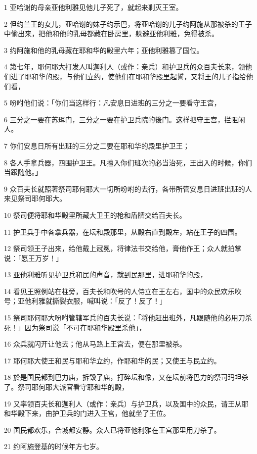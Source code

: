 \par 1 亚哈谢的母亲亚他利雅见他儿子死了，就起来剿灭王室。
\par 2 但约兰王的女儿，亚哈谢的妹子约示巴，将亚哈谢的儿子约阿施从那被杀的王子中偷出来，把他和他的乳母都藏在卧房里，躲避亚他利雅，免得被杀。
\par 3 约阿施和他的乳母藏在耶和华的殿里六年；亚他利雅篡了国位。
\par 4 第七年，耶何耶大打发人叫迦利人（或作：亲兵）和护卫兵的众百夫长来，领他们进了耶和华的殿，与他们立约，使他们在耶和华殿里起誓，又将王的儿子指给他们看，
\par 5 吩咐他们说：「你们当这样行：凡安息日进班的三分之一要看守王宫，
\par 6 三分之一要在苏珥门，三分之一要在护卫兵院的後门。这样把守王宫，拦阻闲人。
\par 7 你们安息日所有出班的三分之二要在耶和华的殿里护卫王；
\par 8 各人手拿兵器，四围护卫王。凡擅入你们班次的必当治死，王出入的时候，你们当跟随他。」
\par 9 众百夫长就照著祭司耶何耶大一切所吩咐的去行，各带所管安息日进班出班的人来见祭司耶何耶大。
\par 10 祭司便将耶和华殿里所藏大卫王的枪和盾牌交给百夫长。
\par 11 护卫兵手中各拿兵器，在坛和殿那里，从殿右直到殿左，站在王子的四围。
\par 12 祭司领王子出来，给他戴上冠冕，将律法书交给他，膏他作王；众人就拍掌说：「愿王万岁！」
\par 13 亚他利雅听见护卫兵和民的声音，就到民那里，进耶和华的殿，
\par 14 看见王照例站在柱旁，百夫长和吹号的人侍立在王左右，国中的众民欢乐吹号；亚他利雅就撕裂衣服，喊叫说：「反了！反了！」
\par 15 祭司耶何耶大吩咐管辖军兵的百夫长说：「将他赶出班外，凡跟随他的必用刀杀死！」因为祭司说「不可在耶和华殿里杀他」，
\par 16 众兵就闪开让他去；他从马路上王宫去，便在那里被杀。
\par 17 耶何耶大使王和民与耶和华立约，作耶和华的民；又使王与民立约。
\par 18 於是国民都到巴力庙，拆毁了庙，打碎坛和像，又在坛前将巴力的祭司玛坦杀了。祭司耶何耶大派官看守耶和华的殿，
\par 19 又率领百夫长和迦利人（或作：亲兵）与护卫兵，以及国中的众民，请王从耶和华殿下来，由护卫兵的门进入王宫，他就坐了王位。
\par 20 国民都欢乐，合城都安静。众人已将亚他利雅在王宫那里用刀杀了。
\par 21 约阿施登基的时候年方七岁。

